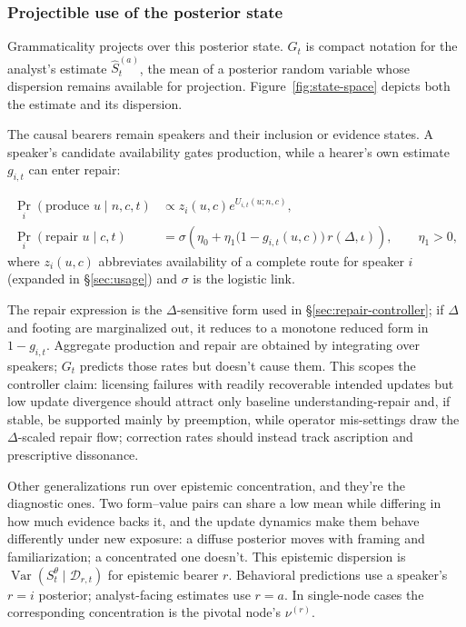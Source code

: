 \subsubsection{Projectible use of the posterior state}
\label{sec:projectible-use}
\label{sec:projectible-G}

Grammaticality projects over this posterior state. $G_t$ is compact notation for
the analyst's estimate $\widehat{S}^{(a)}_t$, the mean of a posterior random
variable whose dispersion remains available for projection.
Figure~\ref{fig:state-space} depicts both the estimate and its
dispersion.

The causal bearers remain speakers and their inclusion or evidence states. A
speaker's candidate availability gates production, while a hearer's own estimate
$g_{i,t}$ can enter repair:

\begin{align}
\Pr_i(\text{produce }u\mid n,c,t) &\propto
  z_i(u,c)e^{U_{i,t}(u;n,c)}, \\
\Pr_i(\text{repair }u\mid c,t) &=
  \sigma\!\left(\eta_0+\eta_1
  \bigl(1-g_{i,t}(u,c)\bigr)\,r(\Delta,\iota)\right), \qquad \eta_1>0,
\end{align}
\noindent where $z_i(u,c)$ abbreviates availability of a complete route for
speaker $i$ (expanded in \S\ref{sec:usage}) and $\sigma$ is the logistic link.

\noindent The repair expression is the $\Delta$-sensitive form used in
\S\ref{sec:repair-controller}; if $\Delta$ and footing are marginalized out, it
reduces to a monotone reduced form in $1-g_{i,t}$. Aggregate production and
repair are obtained by integrating over speakers; $G_t$ predicts those rates but
doesn't cause them. This scopes the controller claim:
licensing failures with readily recoverable intended updates but low update divergence should attract only
baseline understanding-repair and, if stable, be supported mainly by preemption, while
operator mis-settings draw the $\Delta$-scaled repair flow; correction rates
should instead track ascription and prescriptive dissonance.

Other generalizations run over epistemic concentration, and they're the
diagnostic ones. Two form--value pairs can share a low mean while differing in
how much evidence backs it, and the update dynamics make them behave differently
under new exposure: a diffuse posterior moves with framing and familiarization;
a concentrated one doesn't. This epistemic dispersion is
$\operatorname{Var}(S_t^{\theta}\mid\mathcal{D}_{r,t})$ for epistemic bearer
$r$. Behavioral predictions use a speaker's $r=i$ posterior; analyst-facing
estimates use $r=a$. In single-node cases the corresponding concentration is
the pivotal node's $\nu^{(r)}$.

